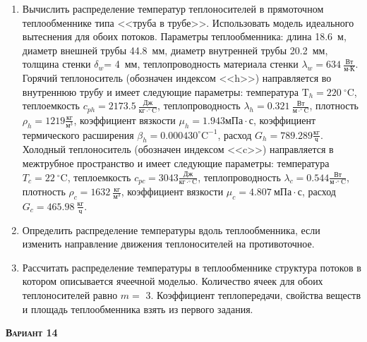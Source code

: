 \begin{enumerate} 
\item Вычислить распределение температур теплоносителей в прямоточном теплообменнике типа <<труба в трубе>>. Использовать модель идеального вытеснения для обоих потоков. Параметры теплообменника: длина  18.6~м, диаметр внешней трубы 44.8~мм,  диаметр внутренней трубы 20.2~мм, толщина стенки $\delta_{w}$=     4~мм,  теплопроводность материала стенки $\lambda_{w}=  634~\frac{\text{Вт}}{\text{м} \cdot \text{К}}$.  Горячий теплоноситель (обозначен индексом <<h>>) направляется во внутреннюю трубу и	 имеет следующие параметры: температура $\text{T}_{h}= 220~^\circ\mathrm{C}$, теплоемкость	  $c_{p{h}}= 2173.5~\frac{\text{Дж}}{\text{кг} \cdot ^\circ\mathrm{C}}$, теплопроводность 		$\lambda_{h}= 0.321~\frac{\text{Вт}}{\text{м} \cdot ^\circ\mathrm{C}}$, плотность 		$\rho_{h}= 1219 \frac{\text{кг}}{\text{м}^3}$, коэффициент вязкости $\mu_{h}=1.943 \text{мПа} 		\cdot \text{с} $, коэффициент термического расширения $\beta_{h}=0.000430 ^\circ\mathrm{C}^{-1}$,		 расход $G_{h}= 789.289 \frac{\text{кг}}{\text{ч}}$. Холодный теплоноситель (обозначен индексом <<c>>) 		 направляется в межтрубное пространство и имеет следующие параметры: температура $T_{c}=   22		 ~^\circ\mathrm{C}$, теплоемкость $c_{p{c}}= 3043 \frac{\text{Дж}}{\text{кг} \cdot ^\circ\mathrm{C}}$,			 теплопроводность $\lambda_{c}=0.544 \frac{\text{Вт}}{\text{м} \cdot ^\circ\mathrm{C}}$, плотность 			 $\rho_{c}=  1632~\frac{\text{кг}}{\text{м}^3}$, коэффициент вязкости $\mu_{c}=4.807~\text{мПа} \cdot \text{с} $, 			 расход $G_{c}=465.98~\frac{\text{кг}}{\text{ч}}$. 

\item Определить распределение температуры вдоль теплообменника, если 	изменить направление движения теплоносителей на противоточное.

\item Рассчитать распределение температуры в теплообменнике структура потоков в котором описывается ячеечной моделью. Количество ячеек для обоих теплоносителей равно $m = $ 3. Коэффициент теплопередачи, свойства веществ и площадь теплообменника взять из первого задания.

\end{enumerate}

\textsc{\textbf{Вариант 14}}

